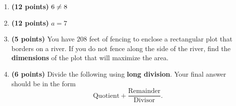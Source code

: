\documentclass[12pt]{amsart}
\begin{document}
\begin{enumerate}
\item {\bf (12 points)} 
 $\athreeone \neq \bthreeone$ 
\vfill 
\def \a{7}\def \atwoone{3}\def \atwotwo{-6}\def \atwothree{2}\def \btwothree{9}\def \sumtwothree{11}\def \diftwothree{-7}\def \bigtwothree{200}\def \powtwothree{81}\def \logtwothree{0.3154648767857287}\def \factortwothree{187}\def \atwofour{1.1}\def \btwofour{1.002}\def \tooshorttwofour{10.1}\def \moneytwofour{10.10}\def \longertwofour{10.10000}\def \atwofive{0.12}\def \btwofive{0.12346}\def \athreeone{6}\def \bthreeone{8}\def \setthreetwo{[2, 5, 6]}\def \athreetwo{2}\def \bthreetwo{5}\def \cthreetwo{6}\def \controlthreethree{-4}\def \athreethree{2}\def \topthreethree{0}\def \athreefour{3}\def \bthreefour{5}\def \listthreefour{[1, 2, 4, 5]}\def \afourone{12}\def \bfourone{4}\def \fracfourone{3}\def \rootfourtwo{20}\def \simplifiedfourtwo{2 \sqrt{5}}\def \sqrtlistfourtwo{[2, 5]}\def \outfourtwo{2}\def \infourtwo{5}\def \wowfourtwo{1}\def \afourthree{-5}\def \nicethreefour{3x^{2}-x^{}-5}\def \nastythreefour{xyz^{3}-5}\def \cfourthree{4}\def \dfourthree{-10}\def \infourthree{4x^{}}\def \outfourthree{-10y^{}}\def \afourfour{1611407}\def \nicefourfour{1,611,407}\def \goodfourfour{1,000,000.12345}\def \badfourfour{1,000,000.1}
\item {\bf (12 points)} 
 $a = \a$ 
\vfill 
\newpage\def \x{52}\def \y{104}\def \L{208}\def \area{5408}
\item {\bf (5 points)} 
 You have $\L$ feet of fencing to enclose a rectangular plot that borders on a river. If you do not fence along the side of the river, find the \textbf{dimensions} of the plot that will maximize the area. \\

  
\vfill \vfill \vfill
\def \a{7}\def \b{4}\def \c{-8}\def \r{10}\def \monicpol{x^{}+7}\def \longnbad{4x^{2}+20x^{}-46}\def \anspol{4x^{}-8}
\item {\bf (6 points)} 
 Divide the following using {\bf long division}. Your final answer should be in the form $$ \text{Quotient} + \dfrac{\text{Remainder}}{\text{Divisor}}.$$

\vspace{3mm}


\end{enumerate}
\end{document}
